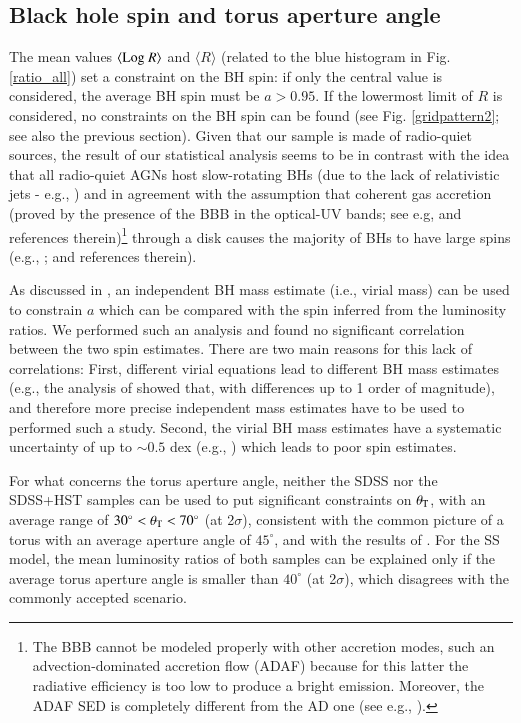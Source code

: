 \documentclass[]{aa}
\begin{document}

\subsection{Black hole spin and torus aperture angle}\label{constraints}

The mean values $\langle {\rm Log}\ R \rangle$ and $\langle R \rangle$ (related to the blue histogram in Fig. \ref{ratio_all}) set a constraint on the BH spin: if only the central value is considered, the average BH spin must be $a > 0.95$. If the lowermost limit of $R$ is considered, no constraints on the BH spin can be found (see Fig. \ref{gridpattern2}; see also the previous section). Given that our sample is made of radio-quiet sources, the result of our statistical analysis seems to be in contrast with the idea that all radio-quiet AGNs host slow-rotating BHs (due to the lack of relativistic jets - e.g., \citealt{UrPad}) and in agreement with the assumption that coherent gas accretion (proved by the presence of the BBB in the optical-UV bands; see e.g, \citet{Shang05} and references therein)\footnote{The BBB cannot be modeled properly with other accretion modes, such an advection-dominated accretion flow (ADAF) because for this latter the radiative efficiency is too low to produce a bright emission. Moreover, the ADAF SED is completely different from the AD one (see e.g., \citealt{Nemm}).} through a disk causes the majority of BHs to have large spins (e.g., \citealt{Elvis}; \citealt{Siko} and references therein).

As discussed in \citet{Campiti,Campitib}, an independent BH mass estimate (i.e., virial mass) can be used to constrain $a$ which can be compared with the spin inferred from the luminosity ratios. We performed such an analysis and found no significant correlation between the two spin estimates. There are two main reasons for this lack of correlations: First, different virial equations lead to different BH mass estimates (e.g., the analysis of \citealt{Shenetal11} showed that, with differences up to 1 order of magnitude), and therefore more precise independent mass estimates have to be used to performed such a study. Second, the virial BH mass estimates have a systematic uncertainty of up to $\sim 0.5$ dex (e.g., \citealt{Ves}) which leads to poor spin estimates.

For what concerns the torus aperture angle, neither the SDSS nor the SDSS+HST samples can be used to put significant constraints on $\theta_{\rm T}$, with an average range of $30^{\circ} < \theta_{\rm T} < 70^{\circ}$ (at 2$\sigma$), consistent with the common picture of a torus with an average aperture angle of $45^{\circ}$, and with the results of \citet{Caldero}. For the SS model, the mean luminosity ratios of both samples can be explained only if the average torus aperture angle is smaller than $40^{\circ}$ (at 2$\sigma$), which disagrees with the commonly accepted scenario.
\end{document}
